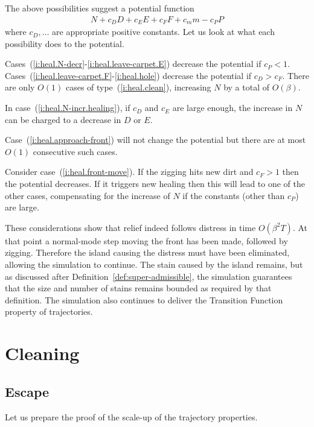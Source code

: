 \documentclass[12pt]{memoir}
\newcommand{\Tu}{T}
\begin{document}
\begin{Proof}
The above possibilities suggest a potential function
\begin{align*}
   N + c_{D}D + c_{E}E + c_{F}F + c_{m}m - c_{P}P
 \end{align*}
where \( c_{D},\dots \) are appropriate positive constants.
Let us look at what each possibility does to the potential.

Cases~(\ref{i:heal.N-decr}-\ref{i:heal.leave-carpet.E}) decrease the potential if \( c_{P}<1 \).
Cases~(\ref{i:heal.leave-carpet.F}-\ref{i:heal.hole}) decrease the potential if \( c_{D}>c_{F} \).
There are only \( O(1) \) cases of type~(\ref{i:heal.clean}), increasing \( N \) by a total of \( O(\beta) \).

In case~(\ref{i:heal.N-incr.healing}), if \( c_{D} \) and \( c_{E} \) are large enough,
the increase in \( N \) can be charged to a decrease in \( D \) or \( E \).

Case~(\ref{i:heal.approach-front}) will not change the potential but there are at most \( O(1) \)
consecutive such cases.
 
Consider case~(\ref{i:heal.front-move}).
If the zigging hits new dirt and \( c_{F}>1 \) then the potential decreases.
If it triggers new healing then this will lead to one of the other cases,
compensating for the increase of \( N \) if the constants (other than \( c_{P} \)) are large.

These considerations show that relief indeed follows distress in time \( O(\beta^{2}\Tu) \).
At that point a normal-mode step moving the front has been made, followed by zigging.
Therefore the island causing the distress must have been eliminated, allowing the 
simulation to continue.
The stain caused by the island remains, but as discussed after Definition~\ref{def:super-admissible},
the simulation guarantees that the
size and number of stains remains bounded as required by that definition.
The simulation also continues to deliver the Transition Function property of trajectories.
\end{Proof}

\section{Cleaning}\label{sec:cleaning}

\subsection{Escape}\label{sec:escape}

Let us prepare the proof of the scale-up of the trajectory properties.
\end{document}
